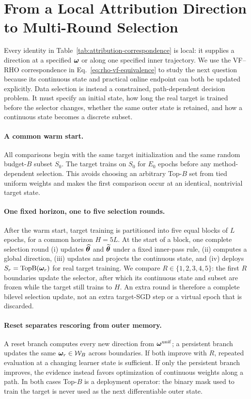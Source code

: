 \section{From a Local Attribution Direction to Multi-Round Selection}
\label{sec:single-to-multi}

Every identity in Table~\ref{tab:attribution-correspondence} is local: it
supplies a direction at a specified ${\bm{\omega}}$ or along one specified inner
trajectory. We use the VF--RHO correspondence in
Eq.~\ref{eq:rho-vf-equivalence} to study the next question because its
continuous state and practical online endpoint can both be updated explicitly.
Data selection is instead a constrained, path-dependent decision problem. It
must specify an initial state, how long the real target is trained before the
selector changes, whether the same outer state is retained, and how a
continuous state becomes a discrete subset.

\paragraph{A common warm start.}
All comparisons begin with the same target initialization and the same random
budget-$B$ subset $S_0$. The target trains on $S_0$ for $E_0$ epochs before any
method-dependent selection. This avoids choosing an arbitrary Top-$B$ set from
tied uniform weights and makes the first comparison occur at an identical,
nontrivial target state.

\paragraph{One fixed horizon, one to five selection rounds.}
After the warm start, target training is partitioned into five equal blocks of
$L$ epochs, for a common horizon $H=5L$. At the start of a block, one complete
selection round (i) updates $\widehat{{\bm{\theta}}}$ and $\widetilde{{\bm{\theta}}}$ under a fixed
inner-pass rule, (ii) computes a global direction, (iii) updates and projects
the continuous state, and (iv) deploys
$S_{r}=\operatorname{TopB}({\bm{\omega}}_r)$ for real target training. We compare
$R\in\{1,2,3,4,5\}$: the first $R$ boundaries update the selector, after which
its continuous state and subset are frozen while the target still trains to
$H$. An extra round is therefore a complete bilevel selection update, not an
extra target-SGD step or a virtual epoch that is discarded.

\paragraph{Reset separates rescoring from outer memory.}
A reset branch computes every new direction from
${\bm{\omega}}^{\mathrm{unif}}$; a persistent branch updates the same
${\bm{\omega}}_r\in\mathcal{W}_{B}$ across boundaries. If both improve with $R$, repeated
evaluation at a changing learner state is sufficient. If only the persistent
branch improves, the evidence instead favors optimization of continuous
weights along a path. In both cases Top-$B$ is a deployment operator: the
binary mask used to train the target is never used as the next differentiable
outer state.

